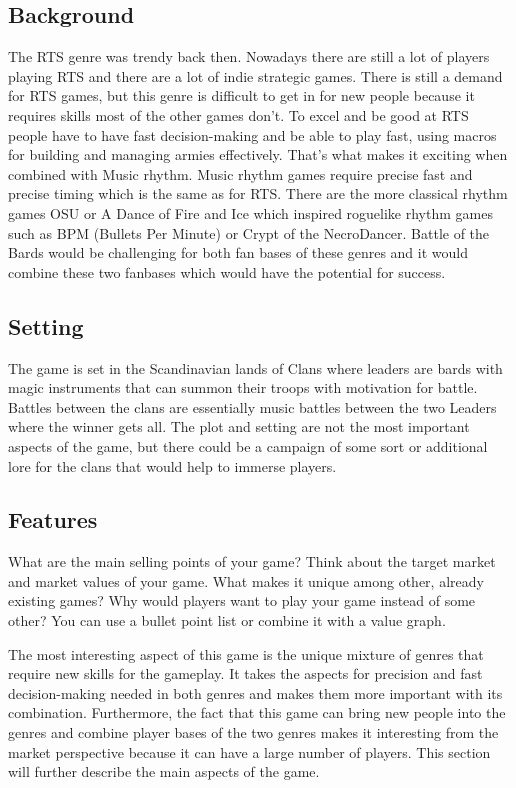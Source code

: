 \documentclass[a4paper,10pt,english]{article}
\begin{document}
\subsection*{Background}

The RTS genre was trendy back then. Nowadays there are still a lot of players playing RTS and there are a lot of indie strategic games. There is still a demand for RTS games, but this genre is difficult to get in for new people because it requires skills most of the other games don't. To excel and be good at RTS people have to have fast decision-making and be able to play fast, using macros for building and managing armies effectively. That's what makes it exciting when combined with Music rhythm. Music rhythm games require precise fast and precise timing which is the same as for RTS. There are the more classical rhythm games OSU or A Dance of Fire and Ice which inspired roguelike rhythm games such as BPM (Bullets Per Minute) or Crypt of the NecroDancer. Battle of the Bards would be challenging for both fan bases of these genres and it would combine these two fanbases which would have the potential for success.

\subsection*{Setting}
The game is set in the Scandinavian lands of Clans where leaders are bards with magic instruments that can summon their troops with motivation for battle. Battles between the clans are essentially music battles between the two Leaders where the winner gets all. The plot and setting are not the most important aspects of the game, but there could be a campaign of some sort or additional lore for the clans that would help to immerse players.

\subsection*{Features}
What are the main selling points of your game? Think about the target market and market values of
your game. What makes it unique among other, already existing games? Why would players want to
play your game instead of some other? You can use a bullet point list or combine it with a value graph.

The most interesting aspect of this game is the unique mixture of genres that require new skills for the gameplay. It takes the aspects for precision and fast decision-making needed in both genres and makes them more important with its combination. Furthermore, the fact that this game can bring new people into the genres and combine player bases of the two genres makes it interesting from the market perspective because it can have a large number of players. This section will further describe the main aspects of the game.
\end{document}
